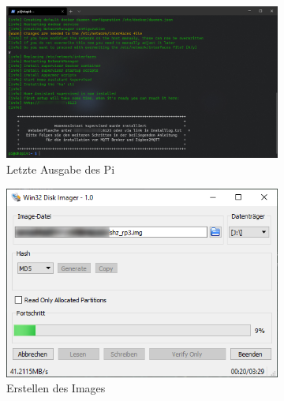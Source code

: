 \begin{figure}[H]
\begin{subfigure}[b]{0.5\linewidth}
        \label{fig:create_image_02}
    \end{subfigure}
    \begin{subfigure}[b]{0.5\linewidth}
        \includegraphics[width=1\textwidth]{img/pi_img_ssh_end.png}
        \caption[Letze Ausgabe des Pi]{Letzte Ausgabe des Pi}
        \label{fig:create_image_03}
    \end{subfigure}
    \begin{subfigure}[b]{0.5\linewidth}
        \includegraphics[width=1\textwidth]{img/pi_img_3_windiskimg.png}
        \caption[Erstellen des Images]{Erstellen des Images}
        \label{fig:create_image_04}
    \end{subfigure}
    \begin{subfigure}[b]{0.5\linewidth}

\end{subfigure}
\end{figure}
